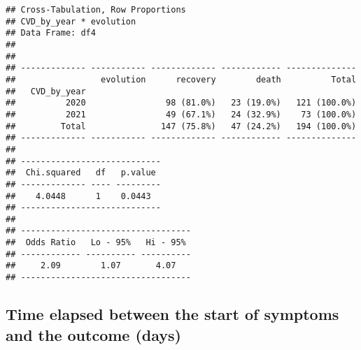 \documentclass[
]{article}
\newenvironment{Shaded}{\begin{snugshade}}{\end{snugshade}}
\newcommand{\AttributeTok}[1]{\textcolor[rgb]{0.13,0.29,0.53}{#1}}
\newcommand{\FunctionTok}[1]{\textcolor[rgb]{0.13,0.29,0.53}{\textbf{#1}}}
\newcommand{\NormalTok}[1]{#1}
\newcommand{\OtherTok}[1]{\textcolor[rgb]{0.56,0.35,0.01}{#1}}
\newcommand{\SpecialCharTok}[1]{\textcolor[rgb]{0.81,0.36,0.00}{\textbf{#1}}}
\newcommand{\StringTok}[1]{\textcolor[rgb]{0.31,0.60,0.02}{#1}}
\begin{document}
\begin{verbatim}
## Cross-Tabulation, Row Proportions  
## CVD_by_year * evolution  
## Data Frame: df4  
## 
## 
## ------------- ----------- ------------- ------------ --------------
##                 evolution      recovery        death          Total
##   CVD_by_year                                                      
##          2020                98 (81.0%)   23 (19.0%)   121 (100.0%)
##          2021                49 (67.1%)   24 (32.9%)    73 (100.0%)
##         Total               147 (75.8%)   47 (24.2%)   194 (100.0%)
## ------------- ----------- ------------- ------------ --------------
## 
## ----------------------------
##  Chi.squared   df   p.value 
## ------------- ---- ---------
##    4.0448      1    0.0443  
## ----------------------------
## 
## ----------------------------------
##  Odds Ratio   Lo - 95%   Hi - 95% 
## ------------ ---------- ----------
##     2.09        1.07       4.07   
## ----------------------------------
\end{verbatim}

\hypertarget{time-elapsed-between-the-start-of-symptoms-and-the-outcome-days}{%
\subsection{Time elapsed between the start of symptoms and the outcome
(days)}\label{time-elapsed-between-the-start-of-symptoms-and-the-outcome-days}}

\begin{Shaded}
\end{Shaded}
\end{document}
